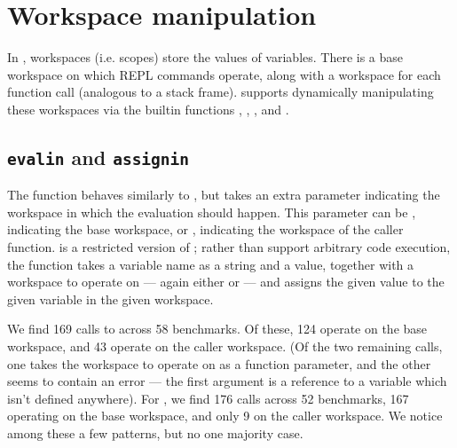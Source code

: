 \section{Workspace manipulation}

In \matlab, workspaces (i.e. scopes) store the values of variables. There is a
base workspace on which REPL commands operate, along with a workspace for each
function call (analogous to a stack frame). \matlab supports dynamically
manipulating these workspaces via the builtin functions ,
, , and .


\subsection{\texttt{evalin} and \texttt{assignin}}

The  function behaves similarly to , but takes an extra
parameter indicating the workspace in which the evaluation should happen. This
parameter can be , indicating the \matlab base workspace, or
, indicating the workspace of the caller function.
 is a restricted version of ; rather than support
arbitrary code execution, the function takes a variable name as a string and a
value, together with a workspace to operate on --- again either 
or  --- and assigns the given value to the given variable in the
given workspace.

We find 169 calls to  across 58 benchmarks. Of these, 124 operate
on the base workspace, and 43 operate on the caller workspace. (Of the two
remaining calls, one takes the workspace to operate on as a function parameter,
and the other seems to contain an error --- the first argument is a reference
to a variable which isn't defined anywhere). For , we find 176
calls across 52 benchmarks, 167 operating on the base workspace, and only 9 on
the caller workspace. We notice among these a few patterns, but no one majority
case.

